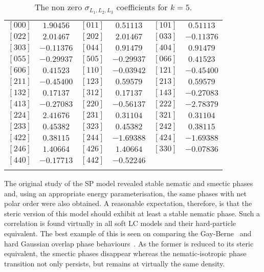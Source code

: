 \begin{table}
    \centering
    \begin{tabular}{||cc||cc||cc||}
    \hhline{|t:==:t:==:t:==:t|}
      $[000]$ & $    1.90456 $ & $[011]$ & $    0.51113 $ & $[101]$ & $    0.51113 $  \\
      $[022]$ & $    2.01467 $ & $[202]$ & $    2.01467 $ & $[033]$ & $   -0.11376 $  \\
      $[303]$ & $   -0.11376 $ & $[044]$ & $    0.91479 $ & $[404]$ & $    0.91479 $  \\
      $[055]$ & $   -0.29937 $ & $[505]$ & $   -0.29937 $ & $[066]$ & $    0.41523 $  \\
      $[606]$ & $    0.41523 $ & $[110]$ & $   -0.03942 $ & $[121]$ & $   -0.45400 $  \\
      $[211]$ & $   -0.45400 $ & $[123]$ & $    0.59579 $ & $[213]$ & $    0.59579 $  \\
      $[132]$ & $    0.17137 $ & $[312]$ & $    0.17137 $ & $[143]$ & $   -0.27083 $  \\
      $[413]$ & $   -0.27083 $ & $[220]$ & $   -0.56137 $ & $[222]$ & $   -2.78379 $ \\
      $[224]$ & $    2.41676 $ & $[231]$ & $    0.31104 $ & $[321]$ & $    0.31104 $  \\
      $[233]$ & $    0.45382 $ & $[323]$ & $    0.45382 $ & $[242]$ & $    0.38115 $  \\
      $[422]$ & $    0.38115 $ & $[244]$ & $   -1.69388 $ & $[424]$ & $   -1.69388 $  \\
      $[246]$ & $    1.40664 $ & $[426]$ & $    1.40664 $ & $[330]$ & $   -0.07836 $  \\
      $[440]$ & $   -0.17713 $ & $[442]$ & $   -0.52246 $ &    &   \\
    \hhline{|b:==:b:==:b:==:b|}
    \end{tabular}
    \caption{The non zero $\sigma_{L_1, L_2, L_3}$ coefficients for $k=5$.}
    \label{tble:HP_sigma_k5}
\end{table}


The original study of the SP model revealed stable nematic and smectic phases and, using an
appropriate energy parameterisation, the same phases with net polar order were also obtained.
A reasonable expectation, therefore, is that
the steric version of this model should exhibit at least a stable nematic phase.
Such a correlation is found virtually in all soft LC models and their hard-particle equivalent.
The best example of this is seen on comparing the Gay-Berne~\cite{deMiguelRull91,deMiguelRull91a} 
and hard Gaussian overlap phase behaviours~\cite{DeMiguelDelRio01}.
As the former is reduced to its steric equivalent, the smectic phases disappear whereas the 
nematic-isotropic phase transition not only persists, but remains at virtually the same density.\\

